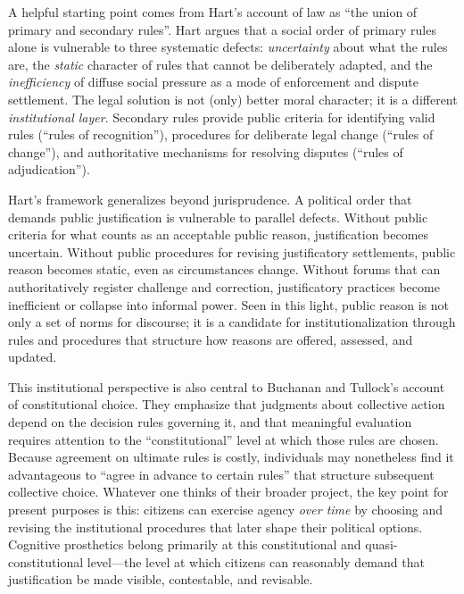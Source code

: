 \documentclass[12pt]{report}
\begin{document}
A helpful starting point comes from Hart’s account of law as \enquote{the union of primary and secondary rules}. \parencite[pp.~79--80]{hart2012concept}
Hart argues that a social order of primary rules alone is vulnerable to three systematic defects: \emph{uncertainty} about what the rules are, the \emph{static} character of rules that cannot be deliberately adapted, and the \emph{inefficiency} of diffuse social pressure as a mode of enforcement and dispute settlement. \parencite[pp.~92--93]{hart2012concept}
The legal solution is not (only) better moral character; it is a different \emph{institutional layer}. 
Secondary rules provide public criteria for identifying valid rules (\enquote{rules of recognition}), procedures for deliberate legal change (\enquote{rules of change}), and authoritative mechanisms for resolving disputes (\enquote{rules of adjudication}). \parencite[pp.~94--97]{hart2012concept}

Hart’s framework generalizes beyond jurisprudence.
A political order that demands public justification is vulnerable to parallel defects.
Without public criteria for what counts as an acceptable public reason, justification becomes uncertain.
Without public procedures for revising justificatory settlements, public reason becomes static, even as circumstances change.
Without forums that can authoritatively register challenge and correction, justificatory practices become inefficient or collapse into informal power.
Seen in this light, public reason is not only a set of norms for discourse; it is a candidate for institutionalization through rules and procedures that structure how reasons are offered, assessed, and updated.

This institutional perspective is also central to Buchanan and Tullock’s account of constitutional choice.
They emphasize that judgments about collective action depend on the decision rules governing it, and that meaningful evaluation requires attention to the \enquote{constitutional} level at which those rules are chosen. \parencite[p.~6]{buchanan1962calculus}
Because agreement on ultimate rules is costly, individuals may nonetheless find it advantageous to \enquote{agree in advance to certain rules} that structure subsequent collective choice. \parencite[p.~7]{buchanan1962calculus}
Whatever one thinks of their broader project, the key point for present purposes is this: citizens can exercise agency \emph{over time} by choosing and revising the institutional procedures that later shape their political options.
Cognitive prosthetics belong primarily at this constitutional and quasi-constitutional level---the level at which citizens can reasonably demand that justification be made visible, contestable, and revisable.
\end{document}
